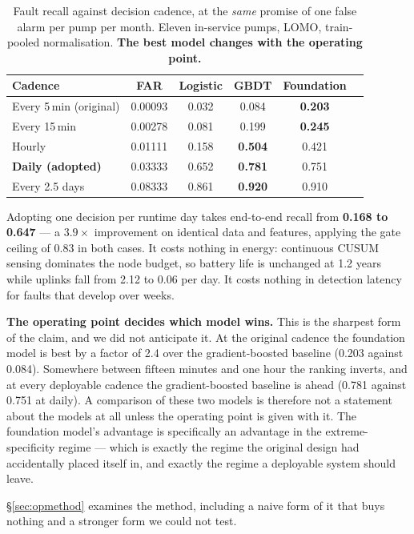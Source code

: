 \documentclass[conference,a4paper,10pt]{IEEEtran}
\begin{document}
\begin{table}[t]
\caption{Fault recall against decision cadence, at the \emph{same} promise of one
false alarm per pump per month. Eleven in-service pumps, LOMO, train-pooled
normalisation. \textbf{The best model changes with the operating point.}}
\label{tab:cadence}
\centering
\small
\begin{tabular}{lccccc}
\toprule
Cadence & FAR & Logistic & GBDT & Foundation \\
\midrule
Every 5\,min (original) & 0.00093 & 0.032 & 0.084 & \textbf{0.203} \\
Every 15\,min & 0.00278 & 0.081 & 0.199 & \textbf{0.245} \\
Hourly & 0.01111 & 0.158 & \textbf{0.504} & 0.421 \\
\textbf{Daily (adopted)} & 0.03333 & 0.652 & \textbf{0.781} & 0.751 \\
Every 2.5 days & 0.08333 & 0.861 & \textbf{0.920} & 0.910 \\
\bottomrule
\end{tabular}
\end{table}

Adopting one decision per runtime day takes end-to-end recall from \textbf{0.168 to
0.647} --- a $3.9\times$ improvement on identical data and features, applying the
gate ceiling of 0.83 in both cases. It costs nothing in energy: continuous CUSUM
sensing dominates the node budget, so battery life is unchanged at 1.2 years while
uplinks fall from 2.12 to 0.06 per day. It costs nothing in detection latency for
faults that develop over weeks.

\textbf{The operating point decides which model wins.} This is the sharpest form of
the claim, and we did not anticipate it. At the original cadence the foundation
model is best by a factor of 2.4 over the gradient-boosted baseline (0.203 against
0.084). Somewhere between fifteen minutes and one hour the ranking inverts, and at
every deployable cadence the gradient-boosted baseline is ahead (0.781 against 0.751
at daily). A comparison of these two models is therefore not a statement about the
models at all unless the operating point is given with it. The foundation model's
advantage is specifically an advantage in the extreme-specificity regime --- which
is exactly the regime the original design had accidentally placed itself in, and
exactly the regime a deployable system should leave.

\S\ref{sec:opmethod} examines the method, including a naive form of it that buys
nothing and a stronger form we could not test.
\end{document}
